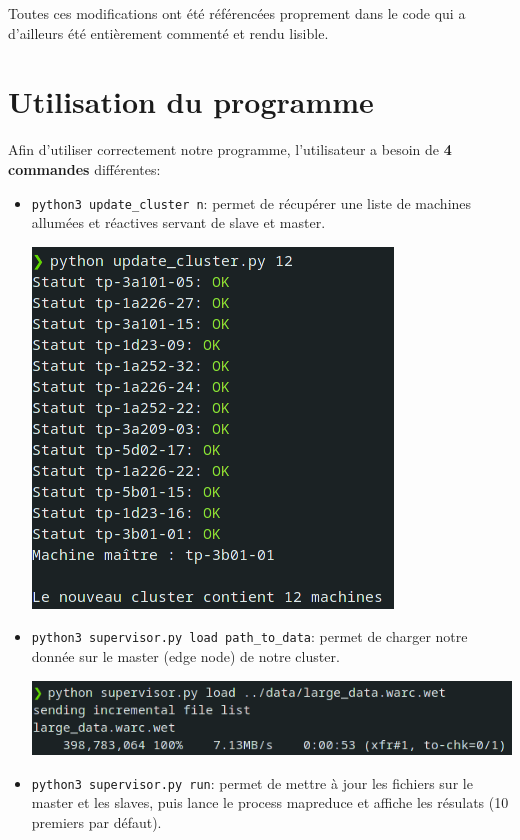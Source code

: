 \documentclass{article}
\begin{document}
Toutes ces modifications ont été référencées proprement dans le code qui a d'ailleurs été entièrement commenté et rendu lisible.

\section{Utilisation du programme}
Afin d'utiliser correctement notre programme, l'utilisateur a besoin de \textbf{4 commandes} différentes:
\begin{itemize}
    \item \texttt{python3 update\_cluster n}: permet de récupérer une liste de machines allumées et réactives servant de slave et master.
    \begin{center}
        \includegraphics[scale=0.5]{img/update.png}
    \end{center}    
    \item \texttt{python3 supervisor.py load path\_to\_data}: permet de charger notre donnée sur le master (edge node) de notre cluster.
    \begin{center}
        \includegraphics[scale=0.5]{img/load.png}
    \end{center}    
    \item \texttt{python3 supervisor.py run}: permet de mettre à jour les fichiers sur le master et les slaves, puis lance le process mapreduce et affiche les résulats (10 premiers par défaut).

\end{itemize}
\end{document}
